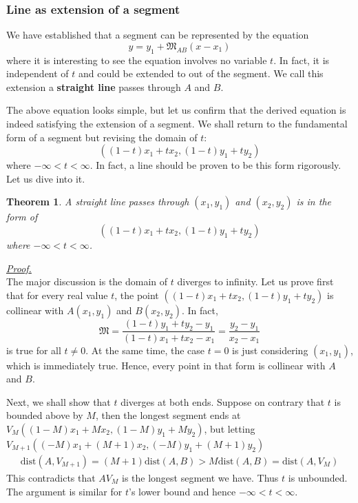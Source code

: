 \documentclass[12pt]{article}
\newtheorem*{theorem}{Theorem}
\renewenvironment{proof}[1][Proof]{\begin{snugshade*} \underline{\textit{{#1}.}}\\}{\hfill \qedsymbol \end{snugshade*}}
\begin{document}
    \subsubsection*{Line as extension of a segment}

    We have established that a segment can be represented by the equation $$y=y_1+\mathfrak{M}_{AB}(x-x_1)$$
    where it is interesting to see the equation involves no variable $t$. In fact, it is independent of $t$ and could be extended to out of the segment. We call this extension a \textbf{straight line} passes through $A$ and $B$.

    The above equation looks simple, but let us confirm that the derived equation is indeed satisfying the extension of a segment. We shall return to the fundamental form of a segment but revising the domain of $t$: $$((1-t)x_1+tx_2, (1-t)y_1+ty_2)$$ where $-\infty<t<\infty$. In fact, a line should be proven to be this form rigorously. Let us dive into it.

    \begin{theorem}
        A straight line passes through $(x_1,y_1)$ and $(x_2, y_2)$ is in the form of $$((1-t)x_1+tx_2, (1-t)y_1+ty_2)$$ where $-\infty<t<\infty$.
    \end{theorem}

    \begin{proof}
        The major discussion is the domain of $t$ diverges to infinity. Let us prove first that for every real value $t$, the point $((1-t)x_1+tx_2, (1-t)y_1+ty_2)$ is collinear with $A(x_1,y_1)$ and $B(x_2,y_2)$. In fact, $$\mathfrak{M}=\frac{(1-t)y_1+ty_2-y_1}{(1-t)x_1+tx_2-x_1}=\frac{y_2-y_1}{x_2-x_1}$$ is true for all $t\neq 0$. At the same time, the case $t=0$ is just considering $(x_1,y_1)$, which is immediately true. Hence, every point in that form is collinear with $A$ and $B$.

        Next, we shall show that $t$ diverges at both ends. Suppose on contrary that $t$ is bounded above by $M$, then the longest segment ends at $V_M((1-M)x_1+Mx_2, (1-M)y_1+My_2)$, but letting $V_{M+1}((-M)x_1+(M+1)x_2, (-M)y_1+(M+1)y_2)$\begin{align*}
            \mathrm{dist}(A,V_{M+1})=(M+1)\mathrm{dist}(A,B)>M\mathrm{dist}(A,B)=\mathrm{dist}(A,V_M)
        \end{align*}
        This contradicts that $AV_M$ is the longest segment we have. Thus $t$ is unbounded. The argument is similar for $t$'s lower bound and hence $-\infty<t<\infty$.
    \end{proof}
\end{document}
